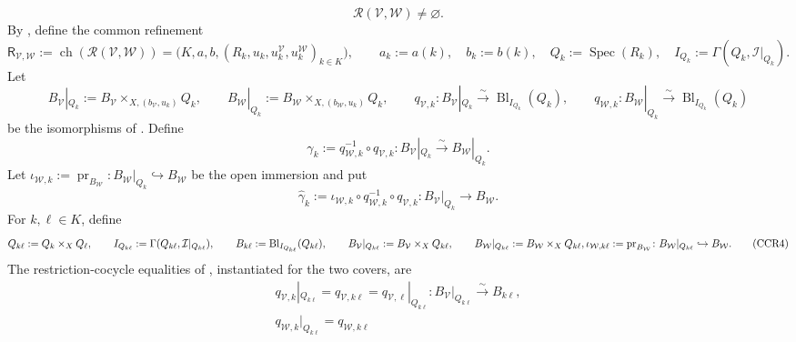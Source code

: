 \begin{definition}
  \[
    \mathscr R(\mathcal V,\mathcal W)\neq\varnothing.              \tag{CCR2}
  \]
  By , define the common refinement
  \[
    \mathsf R_{\mathcal V,\mathcal W}
      :=\operatorname{ch}(\mathscr R(\mathcal V,\mathcal W))
      =\bigl(K,a,b,(R_k,u_k,u_k^{\mathcal V},
        u_k^{\mathcal W})_{k\in K}\bigr),\qquad
    a_k:=a(k),\quad b_k:=b(k),\quad
    Q_k:=\operatorname{Spec}(R_k),\quad
    I_{Q_k}:=\Gamma(Q_k,\mathcal I|_{Q_k}).                        \tag{CCR3}
  \]
  Let
  \[
    B_{\mathcal V}|_{Q_k}:=
      B_{\mathcal V}\times_{X,(b_{\mathcal V},u_k)}Q_k,
    \qquad
    B_{\mathcal W}|_{Q_k}:=
      B_{\mathcal W}\times_{X,(b_{\mathcal W},u_k)}Q_k,
    \qquad
    q_{\mathcal V,k}\colon
      B_{\mathcal V}|_{Q_k}\xrightarrow{\sim}
      \operatorname{Bl}_{I_{Q_k}}(Q_k),
    \qquad
    q_{\mathcal W,k}\colon
      B_{\mathcal W}|_{Q_k}\xrightarrow{\sim}
      \operatorname{Bl}_{I_{Q_k}}(Q_k)
  \]
  be the isomorphisms of
  .  Define
  \[
    \gamma_k:=q_{\mathcal W,k}^{-1}\circ q_{\mathcal V,k}
      \colon B_{\mathcal V}|_{Q_k}\xrightarrow{\sim}
        B_{\mathcal W}|_{Q_k}.
  \]
  Let
  $\iota_{\mathcal W,k}:=\operatorname{pr}_{B_{\mathcal W}}\colon
  B_{\mathcal W}|_{Q_k}\hookrightarrow B_{\mathcal W}$ be the open
  immersion and put
  \[
    \widehat\gamma_k:=
      \iota_{\mathcal W,k}\circ
      q_{\mathcal W,k}^{-1}\circ q_{\mathcal V,k}\colon
      B_{\mathcal V}|_{Q_k}\longrightarrow B_{\mathcal W}.
  \]
  For $k,\ell\in K$, define
  \[
    Q_{k\ell}:=Q_k\times_XQ_\ell,\qquad
    I_{Q_{k\ell}}:=\Gamma(Q_{k\ell},\mathcal I|_{Q_{k\ell}}),\qquad
    B_{k\ell}:=\operatorname{Bl}_{I_{Q_{k\ell}}}(Q_{k\ell}),
    \qquad
    B_{\mathcal V}|_{Q_{k\ell}}:=B_{\mathcal V}\times_XQ_{k\ell},
    \qquad
    B_{\mathcal W}|_{Q_{k\ell}}:=B_{\mathcal W}\times_XQ_{k\ell},\\
    \iota_{\mathcal W,k\ell}:=\operatorname{pr}_{B_{\mathcal W}}\colon
      B_{\mathcal W}|_{Q_{k\ell}}\hookrightarrow B_{\mathcal W}.
                                                                    \tag{CCR4}
  \]
  The restriction-cocycle equalities of
  , instantiated for
  the two covers, are
  \[
  \begin{gathered}
    q_{\mathcal V,k}|_{Q_{k\ell}}
      =q_{\mathcal V,k\ell}
      =q_{\mathcal V,\ell}|_{Q_{k\ell}}
      \colon B_{\mathcal V}|_{Q_{k\ell}}\xrightarrow{\sim}B_{k\ell},\\
    q_{\mathcal W,k}|_{Q_{k\ell}}
      =q_{\mathcal W,k\ell}

\end{gathered}\]
\end{definition}
